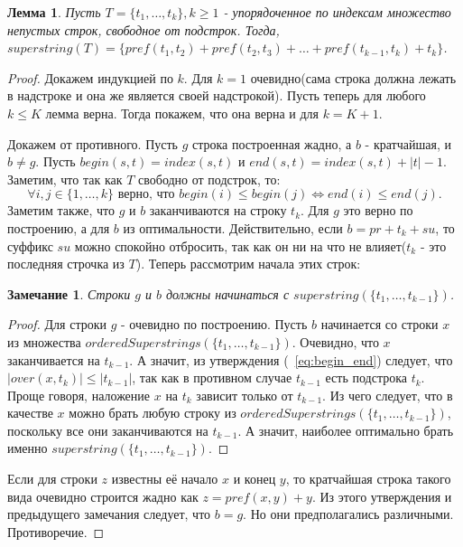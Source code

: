 \documentclass[a4paper,10pt]{article}
\newtheorem{lemma}{Лемма}
\newtheorem{note}{Замечание}
\begin{document}
\begin{lemma}
Пусть $T = \{t_1,\dots,t_k\}, k \geq 1$ - упорядоченное по индексам множество непустых строк, свободное от подстрок.
Тогда, $superstring(T) = \{ pref(t_1, t_2)+pref(t_2, t_3)+\dots+pref(t_{k-1}, t_k)+t_k\}$. 
\end{lemma}

\begin{proof}
Докажем индукцией по $k$.
Для $k = 1$ очевидно(сама строка должна лежать в надстроке и она же является своей надстрокой).
Пусть теперь для любого $k \leq K$ лемма верна. Тогда покажем, что она верна и для $k = K + 1$.

Докажем от противного. Пусть $g$ строка построенная жадно, а $b$ - кратчайшая, и $b \ne g$.
Пусть $begin(s, t) = index(s, t)$ и $end(s, t) = index(s, t) + |t| - 1$.
Заметим, что так как $T$ свободно от подстрок, то:
\begin{equation} \label{eq:begin_end}
	 \forall i,j \in \{ 1, \dots, k \} \mbox{ верно, что } begin(i) \leq begin(j) \iff end(i) \leq end(j).
\end{equation}
Заметим также, что $g$ и $b$ заканчиваются на строку $t_k$. Для $g$ это верно по построению, а для $b$ из оптимальности. 
Действительно, если $b = pr + t_k + su$, то суффикс $su$ можно спокойно отбросить, так как он ни на что не влияет($t_k$ - это последняя строчка из $T$).
Теперь рассмотрим начала этих строк:

\begin{note}
Строки $g$ и $b$ должны начинаться с $superstring(\{ t_1, \dots, t_{k-1} \})$.
\end{note}

\begin{proof}
Для строки $g$ - очевидно по построению.
Пусть $b$ начинается со строки $x$ из множества $orderedSuperstrings(\{ t_1, \dots, t_{k-1} \})$.
Очевидно, что $x$ заканчивается на $t_{k-1}$.
А значит, из утверждения (~\ref{eq:begin_end}) следует, что $|over(x, t_k)| \leq |t_{k-1}|$, так как в противном случае $t_{k-1}$ есть подстрока $t_k$.
Проще говоря, наложение $x$ на $t_k$ зависит только от $t_{k-1}$.
Из чего следует, что в качестве $x$ можно брать любую строку из $orderedSuperstrings(\{ t_1, \dots, t_{k-1} \})$, поскольку все они заканчиваются на $t_{k-1}$.
А значит, наиболее оптимально брать именно $superstring(\{ t_1, \dots, t_{k-1} \})$.
\end{proof}

Если для строки $z$ известны её начало $x$ и конец $y$, то кратчайшая строка такого вида очевидно строится жадно как $z = pref(x, y) + y$.
Из этого утверждения и предыдущего замечания следует, что $b = g$. Но они предполагались различными. Противоречие.
\end{proof}
\end{document}
